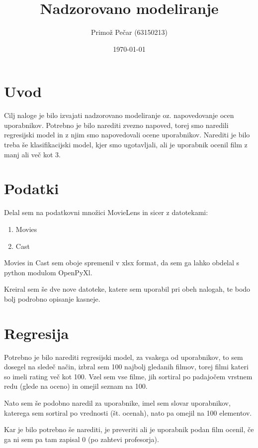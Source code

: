 \documentclass[a4paper,11pt]{article}
\title{Nadzorovano modeliranje}
\author{Primož Pečar (63150213)}
\date{\today}
\begin{document}
\maketitle

\section{Uvod}

Cilj naloge je bilo izvajati nadzorovano modeliranje oz. napovedovanje ocen uporabnikov. Potrebno je bilo narediti zvezno napoved, torej smo naredili regresijski model in z njim smo napovedovali ocene uporabnikov. Narediti je bilo treba še klasifikacijski model, kjer smo ugotavljali, ali je uporabnik ocenil film z manj ali več kot 3.

\section{Podatki}

Delal sem na podatkovni množici MovieLens in sicer z datotekami:
\begin{enumerate}
\item Movies
\item Cast
\end{enumerate}
Movies in Cast sem oboje spremenil v xlsx format, da sem ga lahko obdelal s python modulom OpenPyXl.

Kreiral sem še dve nove datoteke, katere sem uporabil pri obeh nalogah, te bodo bolj podrobno opisanje kasneje.

\section{Regresija}

Potrebno je bilo narediti regresijski model, za vsakega od uporabnikov, to sem dosegel na sledeč način, izbral sem 100 najbolj gledanih filmov, torej filmi kateri so imeli rating več kot 100. Vzel sem vse filme, jih sortiral po padajočem vrstnem redu (glede na oceno) in omejil seznam na 100.\par

Nato sem še podobno naredil za uporabnike, imel sem slovar uporabnikov, katerega sem sortiral po vrednosti (št. ocenah), nato pa omejil na 100 elementov.\par

Kar je bilo potrebno še narediti, je preveriti ali je uporabnik podan film ocenil, če ga ni sem pa tam zapisal 0 (po zahtevi profesorja).\par
\end{document}
